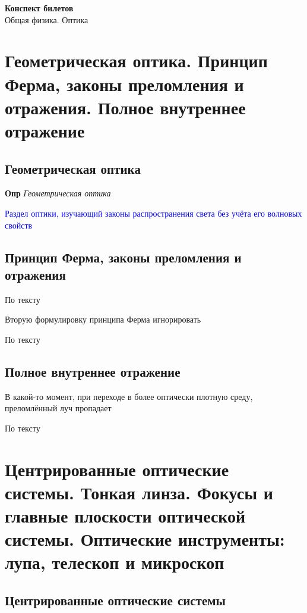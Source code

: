 \documentclass[a4paper, 14pt]{article}
\begin{document}
{\huge
    \begin{center}
    {\textbf{Конспект билетов}}
        \\
        Общая физика.
        Оптика
    \end{center}
}
    \tableofcontents \newpage
    
    \section{Геометрическая оптика.
    Принцип Ферма, законы преломления и отражения.
    Полное внутреннее отражение}
    
    \subsection{Геометрическая оптика}
    
    \textbf{Опр} \textit{Геометрическая оптика}
    
    \textcolor{blue}{Раздел оптики, изучающий законы распространения света без учёта его волновых свойств}
    
    \subsection{Принцип Ферма, законы преломления и отражения}
    
    По тексту
    
    Вторую формулировку принципа Ферма игнорировать
    
    По тексту
    
    \subsection{Полное внутреннее отражение}
    
    В какой-то момент, при переходе в более оптически плотную среду, преломлённый луч пропадает
    
    По тексту
    
    \section{Центрированные оптические системы.
    Тонкая линза.
    Фокусы и главные плоскости оптической системы.
    Оптические инструменты: лупа, телескоп и микроскоп}
    
    \subsection{Центрированные оптические системы}
    
\end{document}
